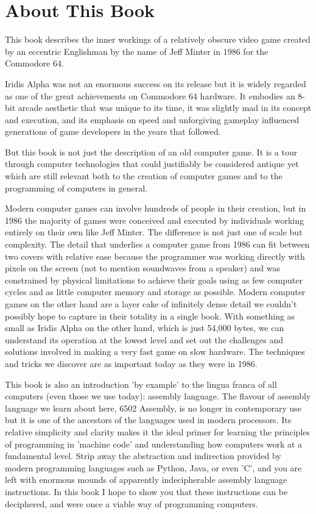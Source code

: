 \chapter*{About This Book} 
This book describes the inner workings of a relatively obscure video game created
by an eccentric Englishman by the name of Jeff Minter in 1986 for the Commodore 64.

Iridis Alpha was not an enormous success on its release but it is widely regarded as
one of the great achievements on Commodore 64 hardware. It embodies an
8-bit arcade aesthetic that was unique to its time, it was slightly mad in its
concept and execution, and its emphasis on speed and unforgiving gameplay
influenced generations of game developers in the years that followed.

But this book is not just the description of an old computer game. 
It is a tour through computer technologies that could justifiably be considered
antique yet which are still relevant both to the creation of 
computer games and to the programming of computers in general.

Modern computer games can involve hundreds of people in their creation, but in 
1986 the majority of games were conceived and executed by individuals working
entirely on their own like Jeff Minter. The difference is not just one of scale but complexity.
The detail that underlies a computer game from 1986 can fit between two covers
with relative ease because the programmer was working directly with pixels on the
screen (not to mention soundwaves from a speaker) and was constrained by physical
limitations to achieve their goals using as few computer cycles and as little
computer memory and storage as possible. Modern computer games on the other hand are a layer cake
of infinitely dense detail we couldn't possibly hope to capture in their totality
in a single book. With something as small as Iridis Alpha on the other hand,
which is just 54,000 bytes, we can 
understand its operation at the lowest level and set out the challenges and
solutions involved in making a very fast game on slow hardware. The techniques and
tricks we discover are as important today as they were in 1986.

This book is also an introduction 'by example' to the lingua franca of all computers
(even those we use today): assembly language. The flavour of assembly language we learn about here,
6502 Assembly, is no longer in contemporary use but it is one of the
ancestors of the languages used in modern processors. Its relative 
simplicity and clarity makes it the ideal primer for learning the principles
of programming in 'machine code' and understanding how computers work at a fundamental
level. Strip away the abstraction and indirection provided by modern programming
languages such as Python, Java, or even 'C', and you are left with enormous mounds
of apparently indecipherable assembly language instructions. In this book I hope
to show you that these instructions can be deciphered, and were once a viable
way of programming computers.

